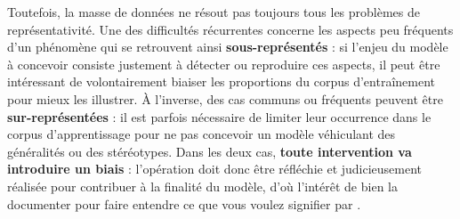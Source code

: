 			Toutefois, la masse de données ne résout pas toujours tous les problèmes de représentativité.
			Une des difficultés récurrentes concerne les aspects peu fréquents d'un phénomène qui se retrouvent ainsi \textbf{sous-représentés} : si l'enjeu du modèle à concevoir consiste justement à détecter ou reproduire ces aspects, il peut être intéressant de volontairement biaiser les proportions du corpus d'entraînement pour mieux les illustrer.
			À l'inverse, des cas communs ou fréquents peuvent être \textbf{sur-représentées} : il est parfois nécessaire de limiter leur occurrence dans le corpus d'apprentissage pour ne pas concevoir un modèle véhiculant des généralités ou des stéréotypes.
			Dans les deux cas, \textbf{toute intervention va introduire un biais} : l'opération doit donc être réfléchie et judicieusement réalisée pour contribuer à la finalité du modèle, d'où l'intérêt de bien la documenter pour faire entendre ce que vous voulez signifier par .
